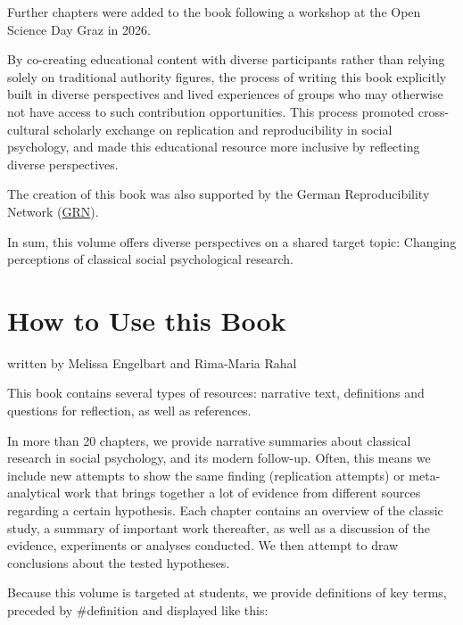 \documentclass[
  letterpaper,
]{book}
\begin{document}
Further chapters were added to the book following a workshop at the Open
Science Day Graz in 2026.

By co-creating educational content with diverse participants rather than
relying solely on traditional authority figures, the process of writing
this book explicitly built in diverse perspectives and lived experiences
of groups who may otherwise not have access to such contribution
opportunities. This process promoted cross-cultural scholarly exchange
on replication and reproducibility in social psychology, and made this
educational resource more inclusive by reflecting diverse perspectives.

The creation of this book was also supported by the German
Reproducibility Network (\href{https://reproducibilitynetwork.de}{GRN}).

In sum, this volume offers diverse perspectives on a shared target
topic: Changing perceptions of classical social psychological research.


\chapter*{\texorpdfstring{{How to Use this
Book}}{How to Use this Book}}\label{how-to-use-this-book}


{written by Melissa Engelbart and Rima-Maria Rahal}

This book contains several types of resources: narrative text,
definitions and questions for reflection, as well as references.

In more than 20 chapters, we provide narrative summaries about classical
research in social psychology, and its modern follow-up. Often, this
means we include new attempts to show the same finding (replication
attempts) or meta-analytical work that brings together a lot of evidence
from different sources regarding a certain hypothesis. Each chapter
contains an overview of the classic study, a summary of important work
thereafter, as well as a discussion of the evidence, experiments or
analyses conducted. We then attempt to draw conclusions about the tested
hypotheses.

Because this volume is targeted at students, we provide definitions of
key terms, preceded by {\#definition} and displayed like this:
\end{document}
